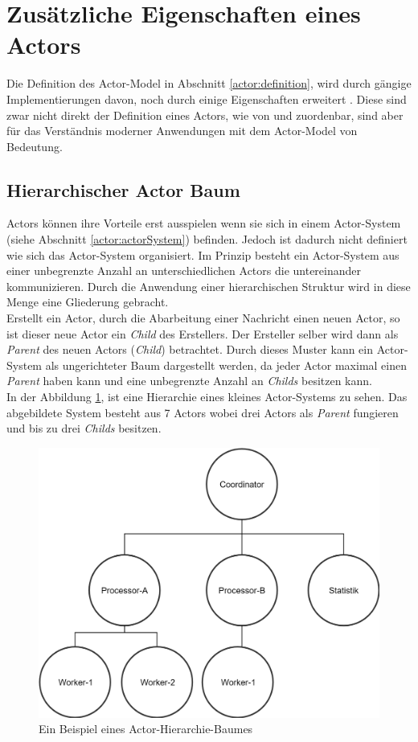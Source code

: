 \section{Zusätzliche Eigenschaften eines Actors}
Die Definition des Actor-Model in Abschnitt \ref{actor:definition}, wird durch gängige Implementierungen davon, noch durch einige Eigenschaften erweitert \citep{Vernon2015ReactiveAkka}. Diese sind zwar nicht direkt der Definition eines Actors, wie von \cite{Hewitt1973AIntelligence} und \cite{Agha1985ActorsSystems} zuordenbar, sind aber für das Verständnis moderner Anwendungen mit dem Actor-Model von Bedeutung.
\subsection{Hierarchischer Actor Baum}
Actors können ihre Vorteile erst ausspielen wenn sie sich in einem Actor-System (siehe Abschnitt \ref{actor:actorSystem}) befinden. Jedoch ist dadurch nicht definiert wie sich das Actor-System organisiert. Im Prinzip besteht ein Actor-System aus einer unbegrenzte Anzahl an unterschiedlichen Actors die untereinander kommunizieren. Durch die Anwendung einer hierarchischen Struktur wird in diese Menge eine Gliederung gebracht. \\
Erstellt ein Actor, durch die Abarbeitung einer Nachricht einen neuen Actor, so ist dieser neue Actor ein \textit{Child} des Erstellers. Der Ersteller selber wird dann als \textit{Parent} des neuen Actors (\textit{Child}) betrachtet. Durch dieses Muster kann ein Actor-System als ungerichteter Baum dargestellt werden, da jeder Actor maximal einen \textit{Parent} haben kann und eine unbegrenzte Anzahl an \textit{Childs} besitzen kann. \\
In der Abbildung \ref{fig:actor:actorHierarchySample}, ist eine Hierarchie eines kleines Actor-Systems zu sehen. Das abgebildete System besteht aus 7 Actors wobei drei Actors als \textit{Parent} fungieren und bis zu drei \textit{Childs} besitzen. 
\begin{figure}
  \centering
  \includegraphics[width=0.6\linewidth]{gfx/actor/actorHierarchy}
  \caption{Ein Beispiel eines Actor-Hierarchie-Baumes}
  \label{fig:actor:actorHierarchySample}
\end{figure}


